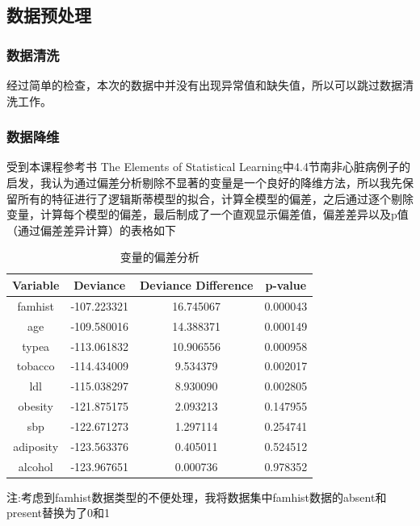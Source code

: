 \documentclass[UTF8]{article}
\begin{document}
	\subsection{数据预处理}
	\subsubsection{数据清洗}
    经过简单的检查，本次的数据中并没有出现异常值和缺失值，所以可以跳过数据清洗工作。\\
    \subsubsection{数据降维}
受到本课程参考书 The Elements of Statistical Learning中4.4节南非心脏病例子的启发，我认为通过偏差分析剔除不显著的变量是一个良好的降维方法，所以我先保留所有的特征进行了逻辑斯蒂模型的拟合，计算全模型的偏差，之后通过逐个剔除变量，计算每个模型的偏差，最后制成了一个直观显示偏差值，偏差差异以及p值（通过偏差差异计算）的表格如下\\
    \begin{table}[ht]
    	\centering
    	\caption{变量的偏差分析}
    	\begin{tabular}{|c|c|c|c|}
    		\hline
    		\textbf{Variable} & \textbf{Deviance} & \textbf{Deviance Difference} & \textbf{p-value} \\ \hline
    		famhist   & -107.223321 & 16.745067 & 0.000043 \\ \hline
    		age       & -109.580016 & 14.388371 & 0.000149 \\ \hline
    		typea     & -113.061832 & 10.906556 & 0.000958 \\ \hline
    		tobacco   & -114.434009 & 9.534379  & 0.002017 \\ \hline
    		ldl       & -115.038297 & 8.930090  & 0.002805 \\ \hline
    		obesity   & -121.875175 & 2.093213  & 0.147955 \\ \hline
    		sbp       & -122.671273 & 1.297114  & 0.254741 \\ \hline
    		adiposity & -123.563376 & 0.405011  & 0.524512 \\ \hline
    		alcohol   & -123.967651 & 0.000736  & 0.978352 \\ \hline
    	\end{tabular}
    	\label{table:deviance_analysis}
    \end{table}

\noindent 注:考虑到famhist数据类型的不便处理，我将数据集中famhist数据的absent和present替换为了0和1\\
\end{document}

